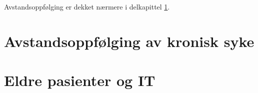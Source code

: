 Avstandsoppfølging er dekket nærmere i delkapittel \ref{sec:remotemonitoring}.

\section{Avstandsoppfølging av kronisk syke}
\label{sec:remotemonitoring}
\blindtext

\section{Eldre pasienter og IT}
\blindtext

